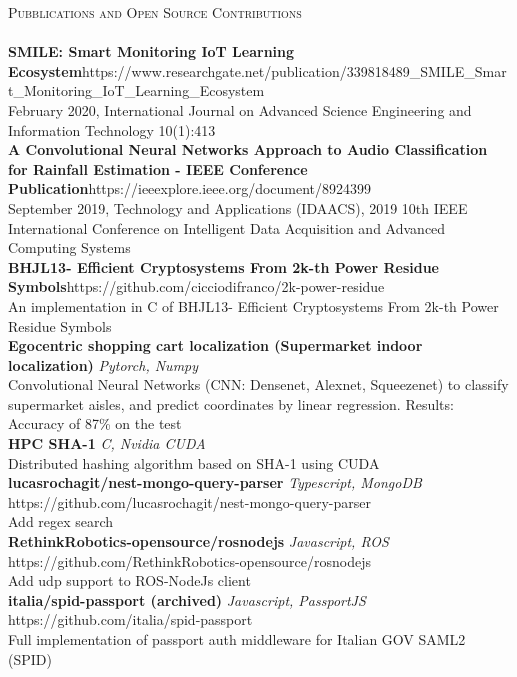 \documentclass[a4paper]{article}
\newcommand{\lineunder} {
    \vspace*{-8pt} \\
    \hspace*{-18pt} \hrulefill \\
}
\newcommand{\header} [1] {
    {\hspace*{-18pt}\vspace*{6pt} \textsc{#1}}
    \vspace*{-6pt} \lineunder
}
\begin{document}
\header{Pubblications and Open Source Contributions}
{\textbf{SMILE: Smart Monitoring IoT Learning Ecosystem}}\hfill https://www.researchgate.net/publication/339818489\_SMILE\_Smart\_Monitoring\_IoT\_Learning\_Ecosystem\\
February 2020, International Journal on Advanced Science Engineering and Information Technology 10(1):413\\
\vspace*{2mm}
{\textbf{A Convolutional Neural Networks Approach to Audio Classification for Rainfall Estimation - IEEE Conference Publication}}\hfill https://ieeexplore.ieee.org/document/8924399\\
September 2019, Technology and Applications (IDAACS), 2019 10th IEEE International Conference on Intelligent Data Acquisition and Advanced Computing Systems\\
\vspace*{2mm}
{\textbf{BHJL13- Efficient Cryptosystems From 2k-th Power Residue Symbols}}\hfill https://github.com/cicciodifranco/2k-power-residue\\
An implementation in C of BHJL13- Efficient Cryptosystems From 2k-th Power Residue Symbols\\
\vspace*{2mm}
{\textbf{Egocentric shopping cart localization (Supermarket indoor localization)}} {\sl Pytorch, Numpy} \\
Convolutional Neural Networks (CNN: Densenet, Alexnet, Squeezenet) to classify supermarket aisles, and predict coordinates by linear regression. Results: Accuracy of 87\% on the test\\
\vspace*{2mm}
{\textbf{HPC SHA-1}} {\sl C, Nvidia CUDA} \\
Distributed hashing algorithm based on SHA-1 using CUDA\\
\vspace*{2mm}
{\textbf{lucasrochagit/nest-mongo-query-parser}} {\sl Typescript, MongoDB} \hfill https://github.com/lucasrochagit/nest-mongo-query-parser\\
Add regex search\\
\vspace*{2mm}
{\textbf{RethinkRobotics-opensource/rosnodejs}} {\sl Javascript, ROS} \hfill https://github.com/RethinkRobotics-opensource/rosnodejs\\
Add udp support to ROS-NodeJs client\\
\vspace*{2mm}
{\textbf{italia/spid-passport (archived)}} {\sl Javascript, PassportJS} \hfill https://github.com/italia/spid-passport\\
Full implementation of passport auth middleware for Italian GOV SAML2 (SPID)\\
\vspace*{2mm}



\ 
\end{document}
